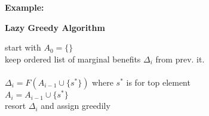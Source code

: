 \documentclass[7pt,parskip]{scrartcl}
\begin{document}
\begin{multicols*}{3}
\textbf{Example: }

\textbf{Lazy Greedy Algorithm} \\
	\begin{algorithmic}
		\State start with $A_0=\{\}$ \\
		\State keep ordered list of marginal benefits $\Delta_i$ from prev. it. \\
		 \\
			\State $\Delta_i = F(A_{i-1} \cup \{s^\ast\})$ where $s^\ast$ is for top element \\
				\State $A_i = A_{i-1} \cup \{s^\ast\}$ \\
			\Else
				\State resort $\Delta_i$ and assign greedily
			\EndIf
		\EndFor
	\end{algorithmic}




\end{multicols*}
\end{document}
